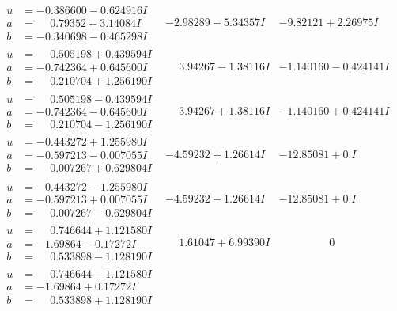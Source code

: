 \documentclass[1p]{elsarticle_modified}
\theoremstyle{definition}
\begin{document}
$$\begin{array}{c|c|c}
\begin{aligned}
u &= -0.386600 - 0.624916 I \\
a &= \phantom{-}0.79352 + 3.14084 I \\
b &= -0.340698 - 0.465298 I\end{aligned}
 & -2.98289 - 5.34357 I & -9.82121 + 2.26975 I \\ \hline\begin{aligned}
u &= \phantom{-}0.505198 + 0.439594 I \\
a &= -0.742364 + 0.645600 I \\
b &= \phantom{-}0.210704 + 1.256190 I\end{aligned}
 & \phantom{-}3.94267 - 1.38116 I & -1.140160 - 0.424141 I \\ \hline\begin{aligned}
u &= \phantom{-}0.505198 - 0.439594 I \\
a &= -0.742364 - 0.645600 I \\
b &= \phantom{-}0.210704 - 1.256190 I\end{aligned}
 & \phantom{-}3.94267 + 1.38116 I & -1.140160 + 0.424141 I \\ \hline\begin{aligned}
u &= -0.443272 + 1.255980 I \\
a &= -0.597213 - 0.007055 I \\
b &= \phantom{-}0.007267 + 0.629804 I\end{aligned}
 & -4.59232 + 1.26614 I & -12.85081 + 0. I\phantom{ +0.000000I} \\ \hline\begin{aligned}
u &= -0.443272 - 1.255980 I \\
a &= -0.597213 + 0.007055 I \\
b &= \phantom{-}0.007267 - 0.629804 I\end{aligned}
 & -4.59232 - 1.26614 I & -12.85081 + 0. I\phantom{ +0.000000I} \\ \hline\begin{aligned}
u &= \phantom{-}0.746644 + 1.121580 I \\
a &= -1.69864 - 0.17272 I \\
b &= \phantom{-}0.533898 - 1.128190 I\end{aligned}
 & \phantom{-}1.61047 + 6.99390 I & \phantom{-0.000000 } 0 \\ \hline\begin{aligned}
u &= \phantom{-}0.746644 - 1.121580 I \\
a &= -1.69864 + 0.17272 I \\
b &= \phantom{-}0.533898 + 1.128190 I\end{aligned}

\end{array}$$
\end{document}
